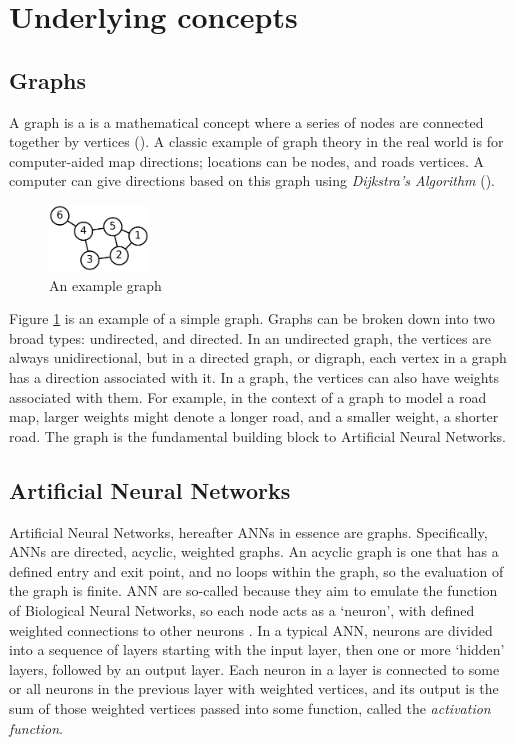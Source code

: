 \section{Underlying concepts}
    \subsection{Graphs}
    A graph is a is a mathematical concept where a series of nodes are connected together by vertices (\cite{chartrand2010graphs}). A classic example of graph theory in the real world is for computer-aided map directions; locations can be nodes, and roads vertices. A computer can give directions based on this graph using {\slshape Dijkstra's Algorithm} (\cite{dijkstra1959note}).

    \begin{figure}[h]
        \centering
        \includegraphics[width=100px]{../img/1000px-6n-graf.png}
        \caption[]{An example graph\footnotemark}
        \label{fig:simplegraph}
    \end{figure}


    Figure \ref{fig:simplegraph} is an example of a simple graph. Graphs can be broken down into two broad types: undirected, and directed. In an undirected graph, the vertices are always unidirectional, but in a directed graph, or digraph, each vertex in a graph has a direction associated with it. In a graph, the vertices can also have weights associated with them. For example, in the context of a graph to model a road map, larger weights might denote a longer road, and a smaller weight, a shorter road. The graph is the fundamental building block to Artificial Neural Networks.

    \subsection{Artificial Neural Networks}
    Artificial Neural Networks, hereafter ANNs in essence are graphs. Specifically, ANNs are directed, acyclic, weighted graphs. An acyclic graph is one that has a defined entry and exit point, and no loops within the graph, so the evaluation of the graph is finite. ANN are so-called because they aim to emulate the function of Biological Neural Networks, so each node acts as a `neuron', with defined weighted connections to other neurons \cite{hopfield1982neural}. In a typical ANN, neurons are divided into a sequence of layers starting with the input layer, then one or more `hidden' layers, followed by an output layer. Each neuron in a layer is connected to some or all neurons in the previous layer with weighted vertices, and its output is the sum of those weighted vertices passed into some function, called the {\slshape activation function}. 

